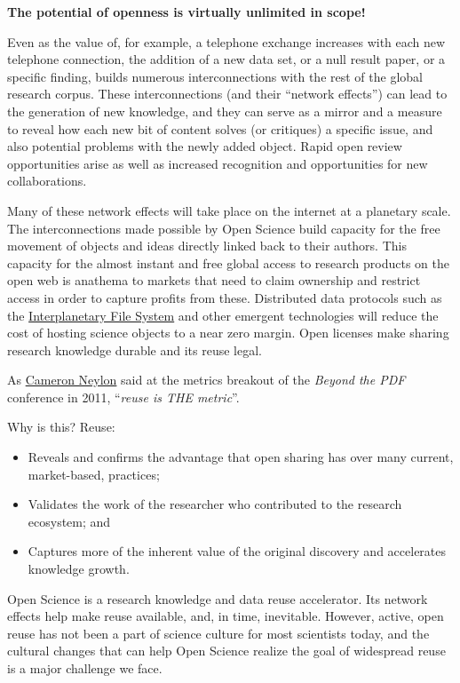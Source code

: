 \documentclass[]{book}
\begin{document}
\textbf{The potential of openness is virtually unlimited in scope!}

Even as the value of, for example, a telephone exchange increases with each new telephone connection, the addition of a new data set, or a null result paper, or a specific finding, builds numerous interconnections with the rest of the global research corpus. These interconnections (and their ``network effects'') can lead to the generation of new knowledge, and they can serve as a mirror and a measure to reveal how each new bit of content solves (or critiques) a specific issue, and also potential problems with the newly added object. Rapid open review opportunities arise as well as increased recognition and opportunities for new collaborations.

Many of these network effects will take place on the internet at a planetary scale. The interconnections made possible by Open Science build capacity for the free movement of objects and ideas directly linked back to their authors. This capacity for the almost instant and free global access to research products on the open web is anathema to markets that need to claim ownership and restrict access in order to capture profits from these. Distributed data protocols such as the \href{https://ipfs.io/}{Interplanetary File System} and other emergent technologies will reduce the cost of hosting science objects to a near zero margin. Open licenses make sharing research knowledge durable and its reuse legal.

As \href{https://en.wikipedia.org/wiki/Cameron_Neylon}{Cameron Neylon} said at the metrics breakout of the \emph{Beyond the PDF} conference in 2011, ``\emph{reuse is THE metric}''.

Why is this? Reuse:

\begin{itemize}
\item
  Reveals and confirms the advantage that open sharing has over many current, market-based, practices;
\item
  Validates the work of the researcher who contributed to the research ecosystem; and
\item
  Captures more of the inherent value of the original discovery and accelerates knowledge growth.
\end{itemize}

Open Science is a research knowledge and data reuse accelerator. Its network effects help make reuse available, and, in time, inevitable. However, active, open reuse has not been a part of science culture for most scientists today, and the cultural changes that can help Open Science realize the goal of widespread reuse is a major challenge we face.
\end{document}
